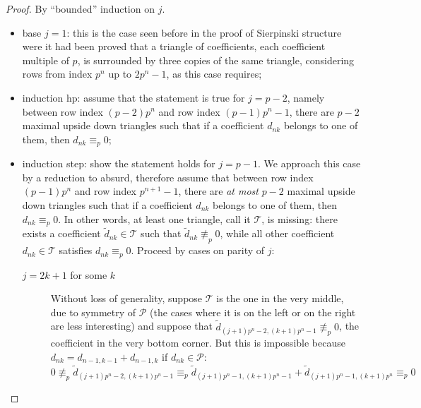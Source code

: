\documentclass[10pt,a4paper]{article} %
\begin{document}
    \begin{proof}
        By ``bounded'' induction on $j$.
        \begin{itemize}
            \item base $j=1$: this is the case seen before in the proof of
                Sierpinski structure were it had been proved that a triangle
                of coefficients, each coefficient multiple of $p$, is surrounded
                by three copies of the same triangle, considering rows from index 
                $p^n$ up to $2 p^n -1$, as this case requires;
            \item induction hp: assume that the statement is true for $j = p-2$, namely
                between row index $(p-2) p^n$ and row index $(p-1)p^n -1$, 
                there are $p-2$ maximal upside down triangles
                such that if a coefficient $d_{nk}$ belongs to one of them, then 
                $d_{nk} \equiv_{p} 0$; 
            \item induction step: show the statement holds for $j=p-1$. 
                We approach this case by a reduction to absurd, therefore assume that
                between row index $(p-1) p^n$ and row index $p^{n+1} -1$, 
                there are \emph{at most} $p-2$ maximal upside down triangles
                such that if a coefficient $d_{nk}$ belongs to one of them, then 
                $d_{nk} \equiv_{p} 0$. In other words, at least one triangle, call it $\mathcal{T}$,
                    is missing: there exists a coefficient
                    $\tilde{d}_{nk}\in\mathcal{T}$ such that $\tilde{d}_{nk}\not\equiv_{p}0$, while all 
                    other coefficient $d_{nk}\in\mathcal{T}$ satisfies $d_{nk} \equiv_{p}0$.
                    Proceed by cases on parity of $j$:
                \begin{description}
                    \item[$j=2k+1$ for some $k$] Without loss of generality, suppose $\mathcal{T}$ is the one in the 
                    very middle, due to symmetry of $\mathcal{P}$ (the cases where it is on the left or on the right are less interesting) and
                    suppose that $\tilde{d}_{(j+1) p^n -2, (k+1)p^n -1}\not\equiv_{p}0$, the coefficient in the very bottom corner.
                    But this is impossible because $d_{nk} = d_{n-1,k-1} + d_{n-1, k}$ if $d_{nk}\in \mathcal{P}$:
                    \begin{displaymath}
                    0\not\equiv_{p}\tilde{d}_{(j+1) p^n -2, (k+1)p^n -1} \equiv_{p} 
                        \tilde{d}_{(j+1) p^n -1, (k+1)p^n -1} + \tilde{d}_{(j+1) p^n -1, (k+1)p^n }\equiv_{p}0
                    \end{displaymath}


\end{description}
\end{itemize}
\end{proof}
\end{document}
